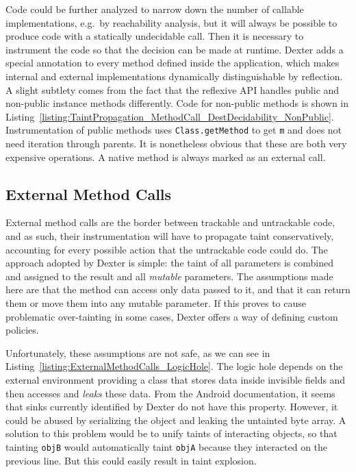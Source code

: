 \documentclass[12pt,twoside,notitlepage]{report}
\begin{document}
Code could be further analyzed to narrow down the number of callable implementations, e.g.\ by reachability analysis, but it will always be possible to produce code with a statically undecidable call. Then it is necessary to instrument the code so that the decision can be made at runtime. Dexter adds a special annotation to every method defined inside the application, which makes internal and external implementations dynamically distinguishable by reflection. A slight subtlety comes from the fact that the reflexive API handles public and non-public instance methods differently. Code for non-public methods is shown in Listing~\ref{listing:TaintPropagation_MethodCall_DestDecidability_NonPublic}. Instrumentation of public methods uses \verb$Class.getMethod$ to get \verb$m$ and does not need iteration through parents. It is nonetheless obvious that these are both very expensive operations. A native method is always marked as an external call.

\subsection{External Method Calls}
\label{section:TaintPropagation_MethodCalls_External}

External method calls are the border between trackable and untrackable code, and as such, their instrumentation will have to propagate taint conservatively, accounting for every possible action that the untrackable code could do. The approach adopted by Dexter is simple: the taint of all parameters is combined and assigned to the result and all \emph{mutable} parameters. The assumptions made here are that the method can access only data passed to it, and that it can return them or move them into any mutable parameter. If this proves to cause problematic over-tainting in some cases, Dexter offers a way of defining custom policies.

Unfortunately, these assumptions are not safe, as we can see in Listing~\ref{listing:ExternalMethodCalls_LogicHole}. The logic hole depends on the external environment providing a class that stores data inside invisible fields and then accesses and \emph{leaks} these data. From the Android documentation, it seems that sinks currently identified by Dexter do not have this property. However, it could be abused by serializing the object and leaking the untainted byte array. A solution to this problem would be to unify taints of interacting objects, so that tainting \verb$objB$ would automatically taint \verb$objA$ because they interacted on the previous line. But this could easily result in taint explosion.
\end{document}
